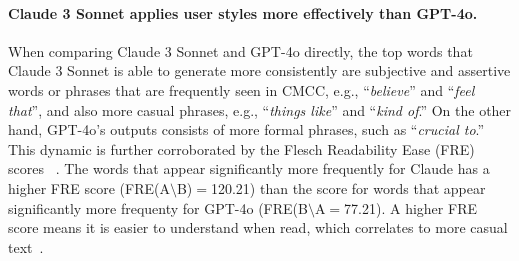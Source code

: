 \paragraph{Claude 3 Sonnet applies user styles more effectively than GPT-4o.}
When comparing Claude 3 Sonnet and GPT-4o directly, the top words that Claude 3 Sonnet is able to generate more consistently are subjective and assertive words or phrases that are frequently seen in CMCC, e.g., ``\textit{believe}'' and ``\textit{feel that}'', and also more casual phrases, e.g., ``\textit{things like}'' and ``\textit{kind of}.''  
On the other hand, GPT-4o's outputs consists of more formal phrases, such as ``\textit{crucial to}.'' 
This dynamic is further corroborated by the Flesch Readability Ease (FRE) scores ~\cite{flesch1948new}.
The words that appear significantly more frequently for Claude has a higher FRE score (FRE(A$\setminus$B)$=$120.21) than the score for words that appear significantly more frequenty for GPT-4o (FRE(B$\setminus$A$=$77.21). 
A higher FRE score means it is easier to understand when read, which correlates to more casual text~\cite{cho2024speechworthyinstructiontunedlanguagemodels}. 




